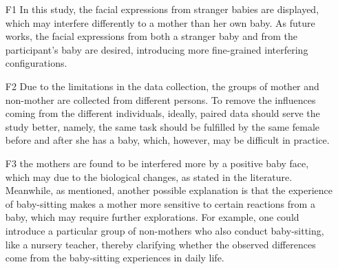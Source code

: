
\begin{itemize}
\item[F1]
In this study, the facial expressions from 
stranger babies are displayed, which may interfere differently
to a mother than her own baby. 
As future works, 
the facial expressions from both a stranger baby and 
from the participant's baby are desired, introducing more 
fine-grained interfering configurations.
\item[F2]
Due to the limitations in the data collection,
the groups of mother 
and non-mother are collected from different persons.
To remove the influences coming from the different individuals,
ideally, paired data should serve the study better, namely,
the same task should be fulfilled by the same female before and after she
has a baby, which, however,
may be difficult in practice.
\item[F3]
the mothers are found to be interfered more by a positive baby face, which may due to the biological changes, as stated in the literature. 
Meanwhile, as mentioned, 
another possible explanation is that the experience of baby-sitting makes a mother more sensitive to certain reactions from a baby, which may require further explorations. 
For example, one could introduce a particular group of non-mothers who also conduct baby-sitting, like a nursery teacher,
thereby clarifying whether the observed differences come from the  baby-sitting experiences in daily life.

\end{itemize}







